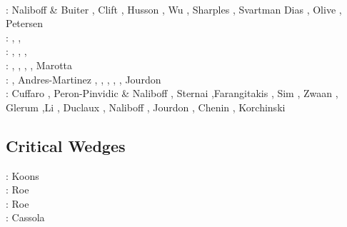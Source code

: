 \begin{scriptsize}
                      \cite{cosb14}\\
\twothousandfifteen: Naliboff \& Buiter \cite{nabu15}, Clift \etal \cite{clbq15}, 
                     Husson \etal \cite{huyb15}, Wu \etal \cite{wulc15},
                     Sharples \etal \cite{shmj15}, Svartman Dias \etal \cite{svlh15},
                     Olive \etal \cite{olbi15}, Petersen \etal \cite{pean15}\\
\twothousandsixteen: \cite{olbm16}, \cite{jekm16},
                     \cite{zwsn16}\\
\twothousandseventeen: \cite{lemh17}, \cite{brcr17},
                       \cite{bekb17}, \cite{nabp17}\\
\twothousandeighteen: \cite{chsm18}\cite{brwm18},
                      \cite{brun18}\cite{tebu18},
                      \cite{jebu18}\cite{sahf18},
                      \cite{pesn18}\cite{mord18},
                      \cite{webe18}\cite{webe18b}
                      \cite{gebu18} Marotta \etal \cite{marc18}\\
\twothousandnineteen: \cite{lisp19}\cite{zwsb19}, 
                      Andres-Martinez \etal \cite{anpa19}, \cite{dual19}
                      \cite{mocb19}, \cite{chmd19}
                      \cite{thhu19}, \cite{jala19}
                      \cite{hooi19}, \cite{lapk19}, 
                      Jourdon \etal \cite{jolm19}\\
\twothousandtwenty: Cuffaro \etal \cite{cump20}, Peron-Pinvidic \& Naliboff \cite{pena20}, 
                    Sternai \cite{ster20},Farangitakis \etal \cite{fahm20}, Sim \etal \cite{siss20}, 
                    Zwaan \etal \cite{zwsr20}, Glerum \etal \cite{glbs20},Li \etal \cite{lial20}, 
                    Duclaux \etal \cite{duhm20}, Naliboff \etal \cite{nagb20}, Jourdon \etal \cite{jolm20},
                    Chenin \etal \cite{chsm20}, Korchinski \etal \cite{kotr21}
\end{scriptsize}




\subsection{Critical Wedges}

\begin{scriptsize}
\nineteenninetyfour: Koons \cite{koon94}\\
\twothousandsix: Roe \etal \cite{rosw06}\\
\twothousandeight: Roe \etal \cite{rowf08}\\
\twothousandthirteen: Cassola \cite{cass13}
\end{scriptsize}



